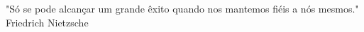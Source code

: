 \begin{epigrafe}
  \vspace*{\fill}
  \begin{otherlanguage}{english}
    \begin{flushright}
      \begin{SingleSpace}
       "Só se pode alcançar um grande êxito quando nos mantemos fiéis a nós mesmos."\\ 
        Friedrich Nietzsche
      \end{SingleSpace}
    \end{flushright}
  \end{otherlanguage}
\end{epigrafe}